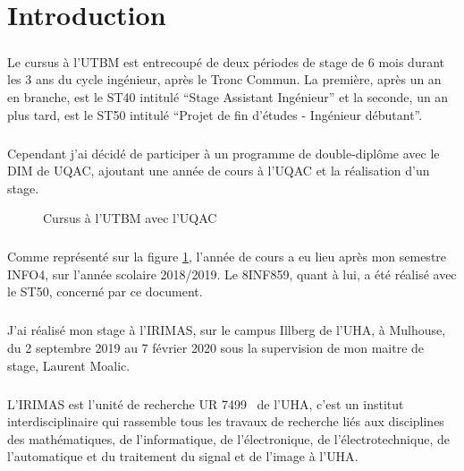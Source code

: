 \documentclass[a4paper,11pt,twoside,french,report]{../common/simplem}
\begin{document}
	\chapter*{Introduction}
		\paragraph*{}
			Le cursus à l'\gls{UTBM} est entrecoupé de deux périodes de stage de 6 mois durant les 3 ans du cycle ingénieur, après le Tronc Commun. La première, après un an en branche, est le ST40 intitulé ``Stage Assistant Ingénieur'' et la seconde, un an plus tard, est le ST50 intitulé ``Projet de fin d'études - Ingénieur débutant''.
		\paragraph*{}
			Cependant j'ai décidé de participer à un programme de double-diplôme avec le \gls{DIM} de \gls{UQAC}, ajoutant une année de cours à l'\gls{UQAC} et la réalisation d'un stage.
			\begin{figure}[H]
				\centering%
				\caption{Cursus à l'\acrshort{UTBM} avec l'\acrshort{UQAC}}%
				\label{fig:cursus_utbm_uqac}%
			\end{figure}
		\paragraph*{}
			Comme représenté sur la figure \ref{fig:cursus_utbm_uqac}, l'année de cours a eu lieu après mon semestre INFO4, sur l'année scolaire 2018/2019. Le \gls{8INF859}, quant à lui, a été réalisé avec le \gls{ST50}, concerné par ce document.
		\paragraph*{}
			J'ai réalisé mon stage à l'\gls{IRIMAS}, sur le campus Illberg de l'\gls{UHA}, à Mulhouse, du 2 septembre 2019 au 7 février 2020 sous la supervision de mon maitre de stage, Laurent Moalic.
		\paragraph*{}
			L'\gls{IRIMAS} est l'unité de recherche UR 7499~\cite{RNSR_IRIMAS} de l'\gls{UHA}, c'est un institut interdisciplinaire qui rassemble tous les travaux de recherche liés aux disciplines des mathématiques, de l'informatique, de l'électronique, de l'électrotechnique, de l'automatique et du traitement du signal et de l'image à l'\gls{UHA}.
\end{document}
